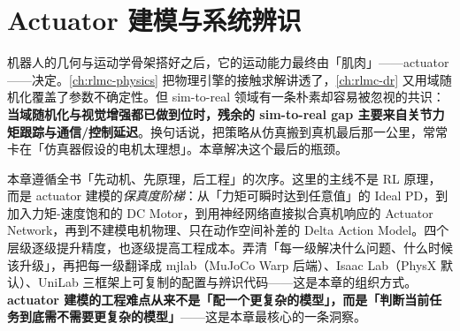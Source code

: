 \chapter{Actuator 建模与系统辨识}\label{ch:rlmc-actuator}


机器人的几何与运动学骨架搭好之后，它的运动能力最终由「肌肉」——actuator——决定。\cref{ch:rlmc-physics} 把物理引擎的接触求解讲透了，\cref{ch:rlmc-dr} 又用域随机化覆盖了参数不确定性。但 sim-to-real 领域有一条朴素却容易被忽视的共识：\textbf{当域随机化与视觉增强都已做到位时，残余的 sim-to-real gap 主要来自关节力矩跟踪与通信/控制延迟}。换句话说，把策略从仿真搬到真机最后那一公里，常常卡在「仿真器假设的电机太理想」。本章解决这个最后的瓶颈。

本章遵循全书「先动机、先原理，后工程」的次序。这里的主线不是 RL 原理，而是 actuator 建模的\emph{保真度阶梯}：从「力矩可瞬时达到任意值」的 Ideal PD，到加入力矩-速度饱和的 DC Motor，到用神经网络直接拟合真机响应的 Actuator Network，再到不建模电机物理、只在动作空间补差的 Delta Action Model。四个层级逐级提升精度，也逐级提高工程成本。弄清「每一级解决什么问题、什么时候该升级」，再把每一级翻译成 mjlab（MuJoCo Warp 后端）、Isaac Lab（PhysX 默认）、UniLab 三框架上可复制的配置与辨识代码——这是本章的组织方式。\textbf{actuator 建模的工程难点从来不是「配一个更复杂的模型」，而是「判断当前任务到底需不需要更复杂的模型」}——这是本章最核心的一条洞察。

